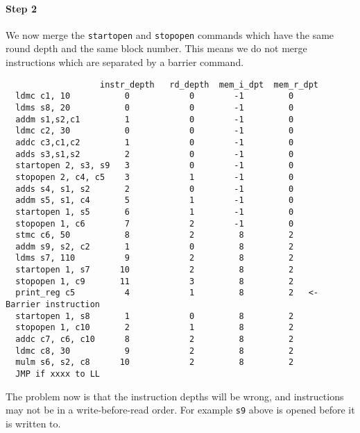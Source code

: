 \paragraph{Step 2}
We now merge the \verb+startopen+ and \verb+stopopen+ commands
which have the same round depth and the same block number.
This means we do not merge instructions which are
separated by a barrier command.
\begin{verbatim}
                   instr_depth   rd_depth  mem_i_dpt  mem_r_dpt
  ldmc c1, 10           0            0        -1         0
  ldms s8, 20           0            0        -1         0
  addm s1,s2,c1         1            0        -1         0
  ldmc c2, 30           0            0        -1         0
  addc c3,c1,c2         1            0        -1         0
  adds s3,s1,s2         2            0        -1         0
  startopen 2, s3, s9   3            0        -1         0
  stopopen 2, c4, c5    3            1        -1         0
  adds s4, s1, s2       2            0        -1         0
  addm s5, s1, c4       5            1        -1         0
  startopen 1, s5       6            1        -1         0
  stopopen 1, c6        7            2        -1         0
  stmc c6, 50           8            2         8         2
  addm s9, s2, c2       1            0         8         2
  ldms s7, 110          9            2         8         2
  startopen 1, s7      10            2         8         2
  stopopen 1, c9       11            3         8         2
  print_reg c5          4            1         8         2   <- Barrier instruction
  startopen 1, s8       1            0         8         2
  stopopen 1, c10       2            1         8         2
  addc c7, c6, c10      8            2         8         2
  ldmc c8, 30           9            2         8         2
  mulm s6, s2, c8      10            2         8         2
  JMP if xxxx to LL
\end{verbatim}
The problem now is that the instruction depths will be wrong,
and instructions may not be in a write-before-read order.
For example \verb+s9+ above is opened before it is written to.

